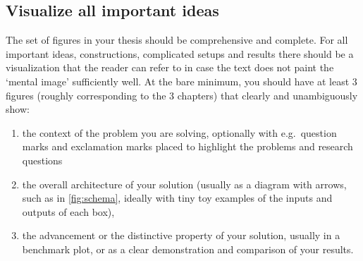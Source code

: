 \subsection{Visualize all important ideas}
The set of figures in your thesis should be comprehensive and complete. For all important ideas, constructions, complicated setups and results there should be a visualization that the reader can refer to in case the text does not paint the `mental image' sufficiently well. At the bare minimum, you should have at least 3 figures (roughly corresponding to the 3 chapters) that clearly and unambiguously show:
\begin{enumerate}
\item the context of the problem you are solving, optionally with e.g.~question marks and exclamation marks placed to highlight the problems and research questions
\item the overall architecture of your solution (usually as a diagram with arrows, such as in \cref{fig:schema}, ideally with tiny toy examples of the inputs and outputs of each box),
\item the advancement or the distinctive property of your solution, usually in a benchmark plot, or as a clear demonstration and comparison of your results.
\end{enumerate}

